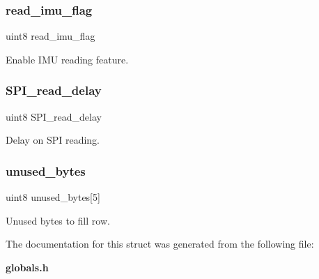\subsubsection{read\+\_\+imu\+\_\+flag}
{\footnotesize\ttfamily uint8 read\+\_\+imu\+\_\+flag}

Enable I\+MU reading feature. \mbox{\label{structst__imu_aa5b15dee0878926cf86de9d3a70d3b30}} 
\subsubsection{S\+P\+I\+\_\+read\+\_\+delay}
{\footnotesize\ttfamily uint8 S\+P\+I\+\_\+read\+\_\+delay}

Delay on S\+PI reading. \mbox{\label{structst__imu_a13769793684b23af8c0cdf6ccf3bd696}} 
\subsubsection{unused\+\_\+bytes}
{\footnotesize\ttfamily uint8 unused\+\_\+bytes[5]}

Unused bytes to fill row. 

The documentation for this struct was generated from the following file\+:\begin{DoxyCompactItemize}
\item 
\textbf{ globals.\+h}\end{DoxyCompactItemize}
